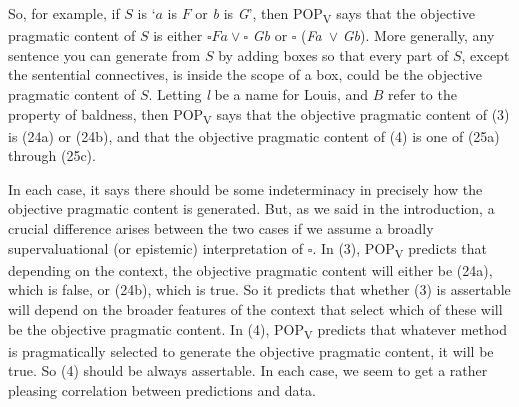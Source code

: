 \noindent So, for example, if \(S\) is `\(a\) is \(F\) or \textit{b} is \textit{G}', then POP\textsubscript{V} says that the objective pragmatic content of \(S\) is either \(\square Fa \vee \square\) \textit{Gb} or \(\square\) (\textit{Fa}~\(\vee\) \textit{Gb}). More generally, any sentence you can generate from \(S\) by adding boxes so that every part of \(S\), except the sentential connectives, is inside the scope of a box, could be the objective pragmatic content of \(S\). Letting \textit{l} be a name for Louis, and \(B\) refer to the property of baldness, then POP\textsubscript{V} says that the objective pragmatic content of (3) is (24a) or (24b), and that the objective pragmatic content of (4) is one of (25a) through (25c).


\noindent In each case, it says there should be some indeterminacy in precisely how the objective pragmatic content is generated. But, as we said in the introduction, a crucial difference arises between the two cases if we assume a broadly supervaluational (or epistemic) interpretation of \(\square\). In (3), POP\textsubscript{V} predicts that depending on the context, the objective pragmatic content will either be (24a), which is false, or (24b), which is true. So it predicts that whether (3) is assertable will depend on the broader features of the context that select which of these will be the objective pragmatic content. In (4), POP\textsubscript{V} predicts that whatever method is pragmatically selected to generate the objective pragmatic content, it will be true. So (4) should be always assertable. In each case, we seem to get a rather pleasing correlation between predictions and data.

